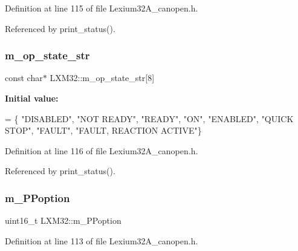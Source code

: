 Definition at line 115 of file Lexium32\+A\+\_\+canopen.\+h.



Referenced by print\+\_\+status().

\mbox{\label{class_l_x_m32_a484bfad62fafa8228dce4ad3cb7bde0c}} 
\subsubsection{\texorpdfstring{m\+\_\+op\+\_\+state\+\_\+str}{m\_op\_state\_str}}
{\footnotesize\ttfamily const char$\ast$ L\+X\+M32\+::m\+\_\+op\+\_\+state\+\_\+str\mbox{[}8\mbox{]}\hspace{0.3cm}{\ttfamily [private]}}

{\bfseries Initial value\+:}
\begin{DoxyCode}
= \{
        \textcolor{stringliteral}{"DISABLED"}, \textcolor{stringliteral}{"NOT READY"},  \textcolor{stringliteral}{"READY"}, \textcolor{stringliteral}{"ON"},
        \textcolor{stringliteral}{"ENABLED"},  \textcolor{stringliteral}{"QUICK STOP"}, \textcolor{stringliteral}{"FAULT"}, \textcolor{stringliteral}{"FAULT, REACTION ACTIVE"}\}
\end{DoxyCode}


Definition at line 116 of file Lexium32\+A\+\_\+canopen.\+h.



Referenced by print\+\_\+status().

\mbox{\label{class_l_x_m32_a12354863abfb65d0997d45d90d23da96}} 
\subsubsection{\texorpdfstring{m\+\_\+\+P\+Poption}{m\_PPoption}}
{\footnotesize\ttfamily uint16\+\_\+t L\+X\+M32\+::m\+\_\+\+P\+Poption\hspace{0.3cm}{\ttfamily [private]}}



Definition at line 113 of file Lexium32\+A\+\_\+canopen.\+h.

\mbox{\label{class_l_x_m32_a749dc73f0c0ea8dda195ed4874830ed2}} 
